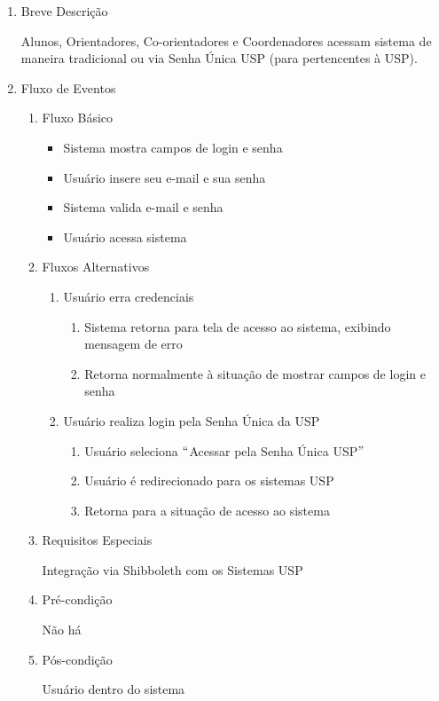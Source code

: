 \begin{enumerate}
    \item Breve Descrição


Alunos, Orientadores, Co-orientadores e Coordenadores acessam sistema de maneira tradicional ou via Senha Única USP (para pertencentes à USP).


    \item Fluxo de Eventos

\begin{enumerate}
    \item Fluxo Básico

\begin{itemize}
    \item Sistema mostra campos de login e senha

    \item Usuário insere seu e-mail e sua senha

    \item Sistema valida e-mail e senha

    \item Usuário acessa sistema
\end{itemize}


    \item Fluxos Alternativos

\begin{enumerate}
    \item Usuário erra credenciais

\begin{enumerate}
    \item Sistema retorna para tela de acesso ao sistema, exibindo mensagem de erro

    \item Retorna normalmente à situação de mostrar campos de login e senha


\end{enumerate}
    \item Usuário realiza login pela Senha Única da USP

\begin{enumerate}
    \item Usuário seleciona $``$Acessar pela Senha Única USP$"$ 

    \item Usuário é redirecionado para os sistemas USP

    \item Retorna para a situação de acesso ao sistema
\end{enumerate}
\end{enumerate}


    \item Requisitos Especiais


Integração via Shibboleth com os Sistemas USP


    \item Pré-condição


Não há


    \item Pós-condição

    Usuário dentro do sistema
\end{enumerate}
\end{enumerate}


